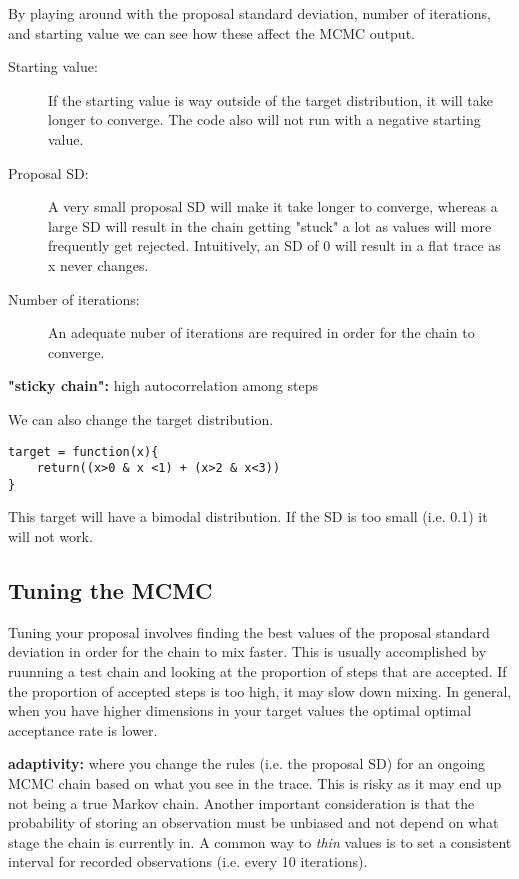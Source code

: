 \documentclass[12pt]{report}
\begin{document}
By playing around with the proposal standard deviation, number of iterations, and starting value we can see how these affect the MCMC output. 
\begin{description}
\item[Starting value:] If the starting value is way outside of the target distribution, it will take longer to converge. The code also will not run with a negative starting value. 
\item[Proposal SD:] A very small proposal SD will make it take longer to converge, whereas a large SD will result in the chain getting "stuck" a lot as values will more frequently get rejected. Intuitively, an SD of 0 will result in a flat trace as x never changes.
\item[Number of iterations:] An adequate nuber of iterations are required in order for the chain to converge. 
\end{description}

\textbf{"sticky chain":} high autocorrelation among steps

We can also change the target distribution.
\begin{lstlisting}
target = function(x){
    return((x>0 & x <1) + (x>2 & x<3))
}
\end{lstlisting}
This target will have a bimodal distribution. If the SD is too small (i.e. 0.1) it will not work.

\subsection{Tuning the MCMC}

Tuning your proposal involves finding the best values of the proposal standard deviation in order for the chain to mix faster. 
This is usually accomplished by ruunning a test chain and looking at the proportion of steps that are accepted. If the proportion of accepted steps is too high, it may slow down mixing. In general, when you have higher dimensions in your target values the optimal optimal acceptance rate is lower.

\textbf{adaptivity:} where you change the rules (i.e. the proposal SD) for an ongoing MCMC chain based on what you see in the trace. This is risky as it may end up not being a true Markov chain. 
Another important consideration is that the probability of storing an observation must be unbiased and not depend on what stage the chain is currently in. 
A common way to \textit{thin} values is to set a consistent interval for recorded observations (i.e. every 10 iterations).
\end{document}
